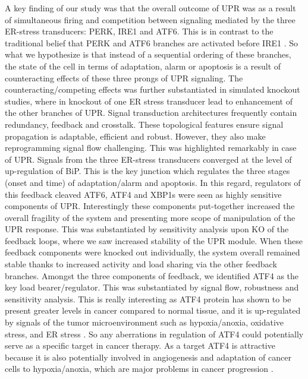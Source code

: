 \documentclass[12pt]{article}
\begin{document}
A key finding of our study was that the overall outcome of UPR was as a result of simultaneous firing and competition between signaling mediated by the three ER-stress transducers: PERK, IRE1 and ATF6. This is in contrast to the traditional belief that PERK and ATF6 branches are activated before IRE1 \cite{szegezdi2006mediators}. So what we hypothesize is that instead of a sequential ordering of these branches, the state of the cell in terms of adaptation, alarm or apoptosis is a result of counteracting effects of these three prongs of UPR signaling. The counteracting/competing effects was further substantiated in simulated knockout studies, where in knockout of one ER stress transducer lead to enhancement of the other branches of UPR. Signal transduction architectures frequently contain redundancy, feedback and crosstalk. These topological features ensure signal propagation is adaptable, efficient and robust. However, they also make reprogramming signal flow challenging. This was highlighted remarkably in case of UPR. Signals from the three ER-stress transducers converged at the level of up-regulation of BiP. This is the key junction which regulates the three stages (onset and time) of adaptation/alarm and apoptosis. In this regard, regulators of this feedback cleaved ATF6, ATF4 and XBP1s were seen as highly sensitive components of UPR. Interestingly these components put-together increased the overall fragility of the system and presenting more scope of manipulation of the UPR response. This was substantiated by sensitivity analysis upon KO of the feedback loops, where we saw increased stability of the UPR module. When these feedback components were knocked out individually, the system overall remained stable thanks to increased activity and load sharing via the other feedback branches. Amongst the three components of feedback, we identified ATF4 as the key load bearer/regulator. This was substantiated by signal flow, robustness and sensitivity analysis. This is really interesting as ATF4 protein has shown to be present greater levels in cancer compared to normal tissue, and it is up-regulated by signals of the tumor microenvironment such as hypoxia/anoxia, oxidative stress, and ER stress \cite{Ameri:2008fk}. So any aberrations in regulation of ATF4 could potentially serve as a specific target in cancer therapy. As a target ATF4 is attractive because it is also potentially involved in angiogenesis and adaptation of cancer cells to hypoxia/anoxia, which are major problems in cancer progression \cite{Ameri:2008fk}.
\end{document}
